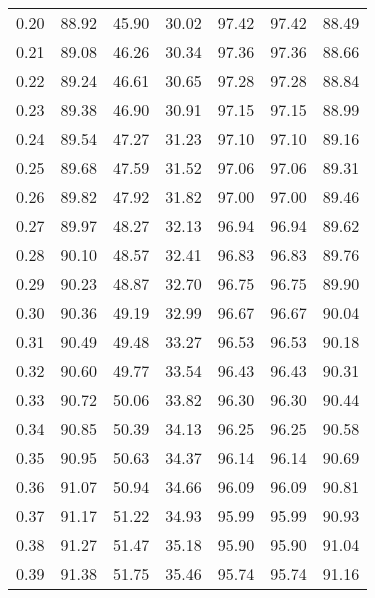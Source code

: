 \begin{tabular}{|c|c|c|c|c|c|c|}
      0.20 &     88.92 &     45.90 &      30.02 &   97.42 &      97.42 &         88.49 \\
      0.21 &     89.08 &     46.26 &      30.34 &   97.36 &      97.36 &         88.66 \\
      0.22 &     89.24 &     46.61 &      30.65 &   97.28 &      97.28 &         88.84 \\
      0.23 &     89.38 &     46.90 &      30.91 &   97.15 &      97.15 &         88.99 \\
      0.24 &     89.54 &     47.27 &      31.23 &   97.10 &      97.10 &         89.16 \\
      0.25 &     89.68 &     47.59 &      31.52 &   97.06 &      97.06 &         89.31 \\
      0.26 &     89.82 &     47.92 &      31.82 &   97.00 &      97.00 &         89.46 \\
      0.27 &     89.97 &     48.27 &      32.13 &   96.94 &      96.94 &         89.62 \\
      0.28 &     90.10 &     48.57 &      32.41 &   96.83 &      96.83 &         89.76 \\
      0.29 &     90.23 &     48.87 &      32.70 &   96.75 &      96.75 &         89.90 \\
      0.30 &     90.36 &     49.19 &      32.99 &   96.67 &      96.67 &         90.04 \\
      0.31 &     90.49 &     49.48 &      33.27 &   96.53 &      96.53 &         90.18 \\
      0.32 &     90.60 &     49.77 &      33.54 &   96.43 &      96.43 &         90.31 \\
      0.33 &     90.72 &     50.06 &      33.82 &   96.30 &      96.30 &         90.44 \\
      0.34 &     90.85 &     50.39 &      34.13 &   96.25 &      96.25 &         90.58 \\
      0.35 &     90.95 &     50.63 &      34.37 &   96.14 &      96.14 &         90.69 \\
      0.36 &     91.07 &     50.94 &      34.66 &   96.09 &      96.09 &         90.81 \\
      0.37 &     91.17 &     51.22 &      34.93 &   95.99 &      95.99 &         90.93 \\
      0.38 &     91.27 &     51.47 &      35.18 &   95.90 &      95.90 &         91.04 \\
      0.39 &     91.38 &     51.75 &      35.46 &   95.74 &      95.74 &         91.16 \\

\end{tabular}
